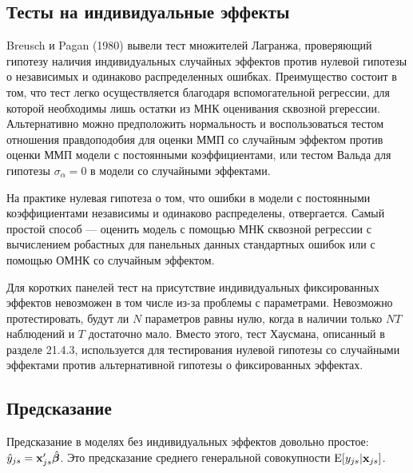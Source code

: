 \subsection{Тесты на индивидуальные эффекты}

Breusch и Pagan (1980) вывели тест множителей Лагранжа, проверяющий гипотезу наличия индивидуальных случайных эффектов против нулевой гипотезы о независимых и одинаково распределенных ошибках. Преимущество состоит в том, что тест легко осуществляется благодаря вспомогательной регрессии, для которой необходимы лишь остатки из МНК оценивания сквозной ргерессии. Альтернативно можно предположить нормальность и воспользоваться тестом отношения правдоподобия для  оценки ММП со случайным эффектом против оценки ММП модели с постоянными коэффициентами, или тестом Вальда для гипотезы $\sigma_{\alpha}=0$ в модели со случайными эффектами.

На практике нулевая гипотеза о том, что ошибки в модели с постоянными коэффициентами независимы и одинаково распределены, отвергается. Самый простой способ --- оценить модель с помощью МНК сквозной регрессии с вычислением робастных для панельных данных стандартных ошибок или с помощью ОМНК со случайным эффектом.

Для коротких панелей тест на присутствие индивидуальных фиксированных эффектов невозможен в том числе из-за проблемы с параметрами. Невозможно протестировать, будут ли $N$ параметров равны нулю, когда в наличии только $NT$ наблюдений и $T$ достаточно мало. Вместо этого, тест Хаусмана, описанный в разделе 21.4.3, используется для тестирования нулевой гипотезы со случайными эффектами против альтернативной гипотезы о фиксированных эффектах.

\subsection{Предсказание}

Предсказание в моделях без индивидуальных эффектов довольно простое: $\hat{y}_{js}=\mathbf{x}'_{js}\hat{\bm\beta}$. Это предсказание среднего генеральной совокупности $\mathrm E[y_{js}|\mathbf{x}_{js}]$.

